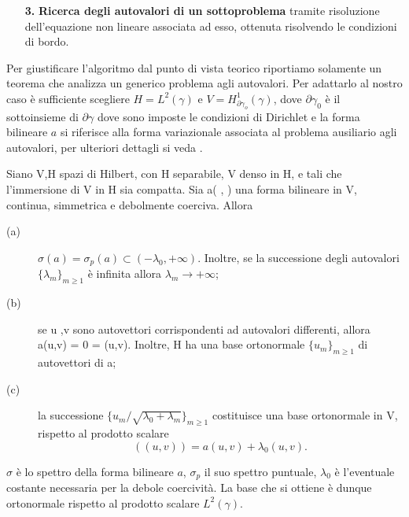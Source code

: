 \begin{itemize}
{}{Esempio - Robin BC}

\item[\textbf{3.}] \textbf{Ricerca degli autovalori di un sottoproblema} tramite risoluzione dell'equazione non lineare associata ad esso, ottenuta risolvendo le condizioni di bordo.
\end{itemize}
Per giustificare l'algoritmo dal punto di vista teorico riportiamo solamente un teorema
che analizza un generico problema agli autovalori. Per adattarlo al nostro caso
\`e sufficiente scegliere $H=L^2(\gamma)$ e $V=H^1_{\partial\gamma_o}(\gamma)$, dove $\partial\gamma_0$ \`e il sottoinsieme
di $\partial\gamma$ dove sono imposte le condizioni di Dirichlet e la forma bilineare $a$ si riferisce alla forma variazionale
associata al problema ausiliario agli autovalori, per ulteriori dettagli si veda \cite{salsa2004equazioni}.
\begin{teorema}
\label{teo: salsa}
Siano V,H spazi di Hilbert, con H separabile, V denso in H, e tali che
l'immersione di V in H sia compatta. Sia a( , ) una forma bilineare in V,
continua, simmetrica e debolmente coerciva. 
Allora
\begin{description}
\item[(a)] $\sigma(a)=\sigma_p(a)\subset(-\lambda_0,+\infty)$. Inoltre, se la successione degli autovalori $\{\lambda_m \}_{m\geq 1}$ \`e infinita allora $\lambda_m\rightarrow +\infty$;
\item[(b)] se u ,v sono autovettori corrispondenti ad autovalori differenti, allora a(u,v) = 0 = (u,v). Inoltre, H ha una base ortonormale $\{ u_m \}_{m\geq 1}$ di autovettori di a;
\item[(c)] la successione $\{u_m / \sqrt{\lambda_0+\lambda_m} \}_{m\geq 1}$ costituisce una base ortonormale in V, rispetto al prodotto scalare
\begin{displaymath}
((u,v))=a(u,v)+\lambda_0 (u,v).
\end{displaymath}
\end{description}
\end{teorema}
$\sigma$ \`e lo spettro della forma bilineare $a$, $\sigma_p$ il suo spettro puntuale, $\lambda_0$ \`e l'eventuale costante necessaria per la debole coercivit\`a.
La base che si ottiene \`e dunque ortonormale rispetto al prodotto scalare $L^2(\gamma)$.

